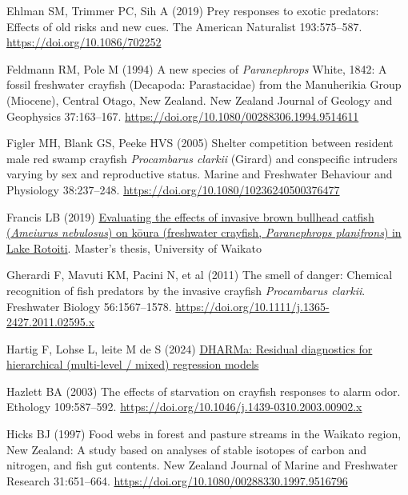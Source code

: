 \documentclass[
  letterpaper,
  DIV=11,
  numbers=noendperiod]{scrartcl}
\newlength{\cslhangindent}
\newenvironment{CSLReferences}[2] %
 {\begin{list}{}{%
  \setlength{\itemindent}{0pt}
  \setlength{\leftmargin}{0pt}
  \setlength{\parsep}{0pt}
  \ifodd #1
   \setlength{\leftmargin}{\cslhangindent}
   \setlength{\itemindent}{-1\cslhangindent}
  \fi
  \setlength{\itemsep}{#2\baselineskip}}}
 {\end{list}}
\begin{document}
\begin{CSLReferences}{1}{1}
Ehlman SM, Trimmer PC, Sih A (2019) Prey responses to exotic predators:
Effects of old risks and new cues. The American Naturalist 193:575--587.
\url{https://doi.org/10.1086/702252}

Feldmann RM, Pole M (1994) A new species of {\emph{Paranephrops}}
{White}, 1842: A fossil freshwater crayfish ({Decapoda}: {Parastacidae})
from the {Manuherikia Group} ({Miocene}), {Central Otago}, {New
Zealand}. New Zealand Journal of Geology and Geophysics 37:163--167.
\url{https://doi.org/10.1080/00288306.1994.9514611}

Figler MH, Blank GS, Peeke HVS (2005) Shelter competition between
resident male red swamp crayfish {\emph{Procambarus clarkii}} ({Girard})
and conspecific intruders varying by sex and reproductive status. Marine
and Freshwater Behaviour and Physiology 38:237--248.
\url{https://doi.org/10.1080/10236240500376477}

Francis LB (2019)
\href{https://researchcommons.waikato.ac.nz/handle/10289/12746}{Evaluating
the effects of invasive brown bullhead catfish ({\emph{Ameiurus
nebulosus}}) on k{ō}ura (freshwater crayfish, {\emph{Paranephrops
planifrons}}) in {Lake Rotoiti}}. Master's thesis, University of Waikato

Gherardi F, Mavuti KM, Pacini N, et al (2011) The smell of danger:
Chemical recognition of fish predators by the invasive crayfish
{\emph{Procambarus clarkii}}. Freshwater Biology 56:1567--1578.
\url{https://doi.org/10.1111/j.1365-2427.2011.02595.x}

{Hartig F, Lohse L, leite M de S} (2024)
\href{https://cran.r-project.org/web/packages/DHARMa/index.html}{DHARMa:
Residual diagnostics for hierarchical (multi-level / mixed) regression
models}

Hazlett BA (2003) The effects of starvation on crayfish responses to
alarm odor. Ethology 109:587--592.
\url{https://doi.org/10.1046/j.1439-0310.2003.00902.x}

Hicks BJ (1997) Food webs in forest and pasture streams in the {Waikato}
region, {New Zealand}: A study based on analyses of stable isotopes of
carbon and nitrogen, and fish gut contents. New Zealand Journal of
Marine and Freshwater Research 31:651--664.
\url{https://doi.org/10.1080/00288330.1997.9516796}


\end{CSLReferences}
\end{document}
